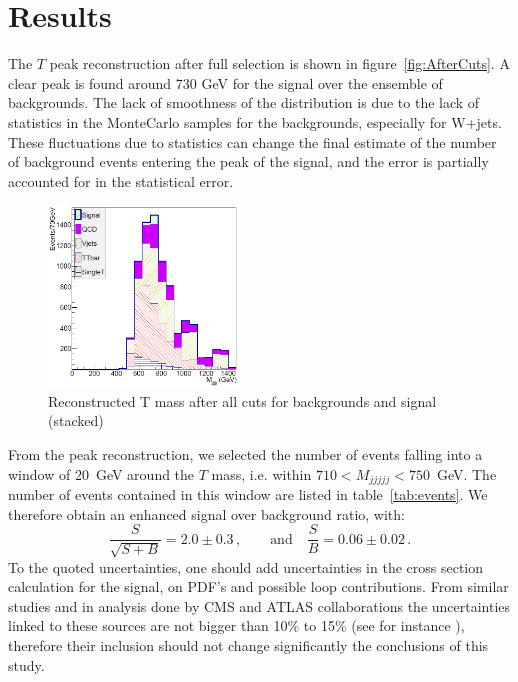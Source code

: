\section{Results}
\label{sec:Pres}

The $T$ peak reconstruction after full selection is shown in figure~\ref{fig:AfterCuts}. A clear peak is found around 730 GeV for the signal over the ensemble of backgrounds. 
The lack of smoothness of the distribution is due to the lack of statistics in the MonteCarlo samples for the  backgrounds, especially for W+jets. These fluctuations due to statistics can change the final estimate of the number of background events entering the peak of the signal, and the error is partially accounted for in the statistical error. 

\begin{figure}[!Hhtbp]
  \begin{center}
    \includegraphics[width=0.45\textwidth]{figs/Pheno/Final.png}
    \caption{Reconstructed T mass after all cuts for backgrounds and signal (stacked)}
    \label{fig:M5J}
  \end{center}
\end{figure}

From the peak reconstruction, we selected the number of events falling into a window of $20$~GeV around the $T$ mass, i.e. within $710 < M_{jjjjj} < 750$~GeV. The number of events contained in this window are listed in table~\ref{tab:events}. We therefore obtain an enhanced signal over background ratio, with:
\begin{equation}
\frac{S}{\sqrt{S+B}}=2.0\pm 0.3\,, \qquad \mbox{and} \quad \frac{S}{B}=0.06\pm 0.02\,. 
\end{equation}
To the quoted uncertainties, one should add uncertainties in the cross section calculation for the signal, on PDF's and possible loop contributions. From similar studies and in analysis done by CMS and ATLAS collaborations the uncertainties linked to these sources are not bigger than 10\% to 15\% (see for instance \cite{Aad:2011yn}), therefore their inclusion should not change significantly the conclusions of this study.

